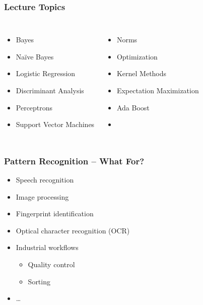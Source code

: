 \ifnosummary
   \begin{frame}
      \frametitle{Lecture Topics}

      \begin{columns}
         \begin{itemize}
            \item Bayes
            \item Na\"ive Bayes
            \item Logistic Regression
            \item Discriminant Analysis
            \item Perceptrons
            \item Support Vector Machines
         \end{itemize}

         \begin{itemize}
            \item Norms
            \item Optimization
            \item Kernel Methods
            \item Expectation Maximization
            \item Ada Boost
            \item[]
         \end{itemize}
      \end{columns}
   \end{frame}


   \begin{frame}
      \frametitle{Pattern Recognition -- What For?}

      \begin{itemize}
         \item Speech recognition
         \item Image processing
         \item Fingerprint identification
         \item Optical character recognition (OCR)
         \item Industrial workflows
           \begin{itemize}
              \item Quality control
              \item Sorting
           \end{itemize}
         \item \ldots
      \end{itemize}
   \end{frame}

